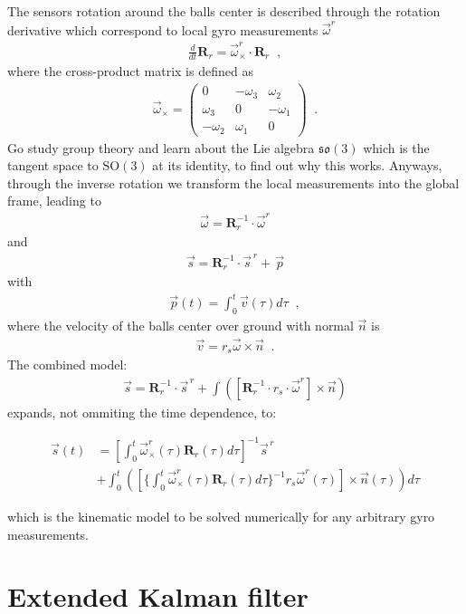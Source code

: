 The sensors rotation around the balls center is described through the rotation derivative which correspond to local gyro measurements $\vec{\omega}^r$   
\begin{align}
\frac{d}{dt}{\mathbf{R}}_r = \vec{\omega}^r_{\times} \cdot \mathbf{R}_r \;\; ,
\end{align}
where the cross-product matrix is defined as 
\begin{align}
\vec{\omega}_{\times} = 
\begin{pmatrix}
0 & -\omega_3 & \omega_2\\
\omega_3 & 0 & -\omega_1\\
-\omega_2 & \omega_1 & 0
\end{pmatrix} \;\; .
\end{align}
Go study group theory and learn about the Lie algebra $\mathfrak{so}(3)$ which is the tangent space to $\textrm{SO}(3)$ at its identity, to find out why this works. 
Anyways, through the inverse rotation we transform the local measurements into the global frame, leading to 
\begin{align}
\vec{\omega} = \mathbf{R}_r^{-1} \cdot \vec{\omega}^r
\end{align}
and
\begin{align}
\vec{s} = \mathbf{R}_r^{-1} \cdot \vec{s}^{\,r} + \,\vec{p}
\end{align}
with 
\begin{align}
\vec{p}(t) = \int_0^t \vec{v}(\tau) d\tau \;\; ,
\end{align}
where the velocity of the balls center over ground with normal $\vec{n}$ is
\begin{align}
\vec{v} = r_s \vec{\omega} \times \vec{n}\;\; .
\end{align}
The combined model:
\begin{align}
\vec{s} = \mathbf{R}_r^{-1} \cdot \vec{s}^{\,r} + \int \left( \left[ \mathbf{R}_r^{-1} \cdot r_s \cdot \vec{\omega}^r \right] \times \vec{n}\right)
\end{align}
expands, not ommiting the time dependence, to:
\begin{small}
  \begin{align}
    \vec{s}(t) &= \left[ \int_0^t \vec{\omega}^r_{\times}(\tau)\mathbf{R}_r(\tau)d\tau \right]^{-1} \vec{s}^{\,r} \\ \nonumber
    &+ \int_0^t\left( \left[ \bigg\{ \int_0^t \vec{\omega}^r_{\times}(\tau)\mathbf{R}_r(\tau)d\tau \bigg\} ^{-1} r_s \vec{\omega}^r(\tau) \right]\times \vec{n}(\tau) \right) d\tau
  \end{align}
\end{small}
which is the kinematic model to be solved numerically for any arbitrary gyro measurements.

\section{Extended Kalman filter}